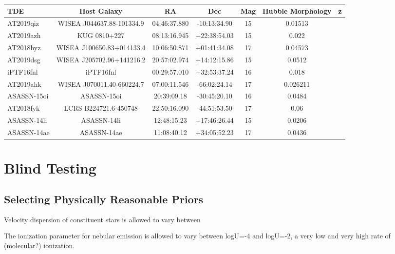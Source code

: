 \documentclass[a4paper,11pt]{article}
\begin{document}
\begin{tabular}
  {| l | c | c | c | c | c | r |}
  \hline
  TDE         & Host Galaxy               & RA           & Dec          & Mag & Hubble Morphology & z        \\
  \hline
  AT2019qiz   & WISEA J044637.88-101334.9 & 04:46:37.880 & -10:13:34.90 & 15                      & 0.01513  \\
  AT2019azh   & KUG 0810+227              & 08:13:16.945 & +22:38:54.03 & 15                      & 0.022    \\
  AT2018hyz   & WISEA J100650.83+014133.4 & 10:06:50.871 & +01:41:34.08 & 17                      & 0.04573  \\
  AT2019dsg   & WISEA J205702.96+141216.2 & 20:57:02.974 & +14:12:15.86 & 15                      & 0.0512   \\
  iPTF16fnl   & iPTF16fnl                 & 00:29:57.010 & +32:53:37.24 & 16                      & 0.018    \\
  AT2019ahk   & WISEA J070011.40-660224.7 & 07:00:11.546 & -66:02:24.14 & 17                      & 0.026211 \\
  ASASSN-15oi & ASASSN-15oi               & 20:39:09.18  & -30:45:20.10 & 16                      & 0.0484   \\
  AT2018fyk   & LCRS B224721.6-450748     & 22:50:16.090 & -44:51:53.50 & 17                      & 0.06     \\
  ASASSN-14li & ASASSN-14li               & 12:48:15.23  & +17:46:26.44 & 15                      & 0.0206   \\
  ASASSN-14ae & ASASSN-14ae               & 11:08:40.12  & +34:05:52.23 & 17                      & 0.0436   \\
  \hline
\end{tabular}

\section{Blind Testing}\label{sec:blind_testing}

\subsection{Selecting Physically Reasonable Priors}\label{sec:prior_selection}

Velocity dispersion of constituent stars is allowed to vary between

The ionization parameter for nebular emission is allowed to vary between logU=-4 and logU=-2, a very low and very high rate of (molecular?) ionization.
\end{document}
